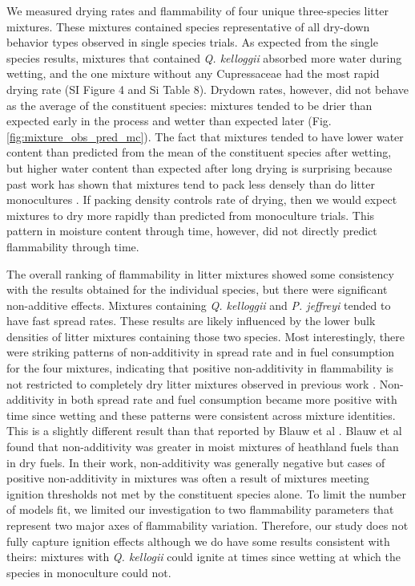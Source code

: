 \documentclass[letterpaper,12pt]{article}
\begin{document}
We measured drying rates and flammability of four unique three-species litter
mixtures. These mixtures contained species representative of all dry-down
behavior types observed in single species trials. As expected from the single
species results, mixtures that contained \emph{Q. kelloggii} absorbed more
water during wetting, and the one mixture without any Cupressaceae had the most
rapid drying rate (SI Figure 4 and Si Table 8). Drydown rates, however, did not behave as the
average of the constituent species: mixtures tended to be drier than expected
early in the process and wetter than expected later (Fig.
\ref{fig:mixture_obs_pred_mc}). The fact that mixtures tended to have lower
water content than predicted from the mean of the constituent species after
wetting, but higher water content than expected after long drying is surprising
because past work has shown that mixtures tend to pack less densely than do
litter monocultures \citep[][, Table 2]{Magalhaes+Schwilk-2012}. If packing
density controls rate of drying, then we would expect mixtures to dry more
rapidly than predicted from monoculture trials. This pattern in moisture
content through time, however, did not directly predict flammability through
time.


The overall ranking of flammability in litter mixtures showed some consistency
with the results obtained for the individual species, but there were
significant non-additive effects. Mixtures containing \emph{Q. kelloggii} and
\emph{P. jeffreyi} tended to have fast spread rates. These results are likely
influenced by the lower bulk densities of litter mixtures containing those two
species. Most interestingly, there were striking patterns of non-additivity in
spread rate and in fuel consumption for the four mixtures, indicating that
positive non-additivity in flammability is not restricted to completely dry
litter mixtures observed in previous work \citep{Magalhaes+Schwilk-2012,
  VanAltena+Logtestjin+etal-2012}. Non-additivity in both spread rate and fuel
consumption became more positive with time since wetting and these patterns
were consistent across mixture identities. This is a slightly different result
than that reported by Blauw et al \citeyear{Blauw+Wensink+etal-2015}. Blauw et
al found that non-additivity was greater in moist mixtures of heathland fuels
than in dry fuels. In their work, non-additivity was generally negative but cases of 
positive non-additivity in mixtures was often a result of mixtures meeting
ignition thresholds not met by the constituent species alone. To limit the
number of models fit, we limited our investigation to two flammability
parameters that represent two major axes of flammability variation. Therefore,
our study does not fully capture ignition effects although we do have some
results consistent with theirs: mixtures with \emph{Q. kellogii} could ignite
at times since wetting at which the species in monoculture could not.
\end{document}
